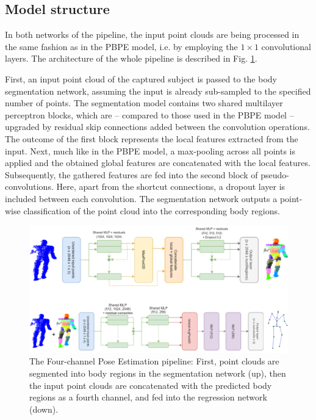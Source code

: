 \subsection{Model structure}
In both networks of the pipeline, the input point clouds are being processed in the same fashion as in the PBPE model, i.e. by employing the $1 \times 1$ convolutional layers. The architecture of the whole pipeline is described in Fig. \ref{fig:4chan_pipeline}.\par
\vspace{5mm}
\noindent First, an input point cloud of the captured subject is passed to the body segmentation network, assuming the input is already sub-sampled to the specified number of points. The segmentation model contains two shared multilayer perceptron blocks, which are – compared to those used in the PBPE model – upgraded by residual skip connections added between the convolution operations. The outcome of the first block represents the local features extracted from the input. Next, much like in the PBPE model, a max-pooling across all points is applied and the obtained global features are concatenated with the local features. Subsequently, the gathered features are fed into the second block of pseudo-convolutions. Here, apart from the shortcut connections, a dropout layer is included between each convolution. The segmentation network outputs a point-wise classification of the point cloud into the corresponding body regions.\par
\vspace{5mm}
\vspace{5mm}
\begin{figure}[H]
\begin{center}
  \includegraphics[width=\textwidth]{images/implementation/4chan_pipeline_fixed.png}
  \caption[The Four-channel Pose Estimation pipeline.]{ The Four-channel Pose Estimation pipeline: First, point clouds are segmented into body regions in the segmentation network (up), then the input point clouds are concatenated with the predicted body regions as a fourth channel, and fed into the regression network (down).}
  \label{fig:4chan_pipeline}
\end{center}
\end{figure}

